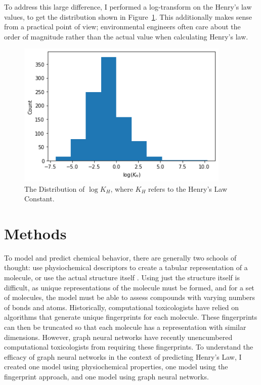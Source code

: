\documentclass[12pt, oneside]{article}   	%
\begin{document}
To address this large difference, I performed a log-transform on the Henry's law values, to get the distribution shown in Figure~\ref{fig:dist}. This additionally makes sense from a practical point of view; environmental engineers often care about the order of magnitude rather than the actual value when calculating Henry's law.

\begin{figure}[h!] %
   \centering
   \includegraphics[width=4in]{data-dist.png} 
   \caption{The Distribution of $\log K_H$, where $K_H$ refers to the Henry's Law Constant.}
   \label{fig:dist}
\end{figure}


\section{Methods}
To model and predict chemical behavior, there are generally two schools of thought: use physiochemical descriptors to create a tabular representation of a molecule, or use the actual structure itself \cite{Ramsundar-et-al-2019}. Using just the structure itself is difficult, as unique representations of the molecule must be formed, and for a set of molecules, the model must be able to assess compounds with varying numbers of bonds and atoms. Historically, computational toxicologists have relied on algorithms that generate unique fingerprints for each molecule. These fingerprints can then be truncated so that each molecule has a representation with similar dimensions. However, graph neural networks have recently unencumbered computational toxicologists from requiring these fingerprints. To understand the efficacy of graph neural networks in the context of predicting Henry's Law, I created one model using physiochemical properties, one model using the fingerprint approach, and one model using graph neural networks.
\end{document}
